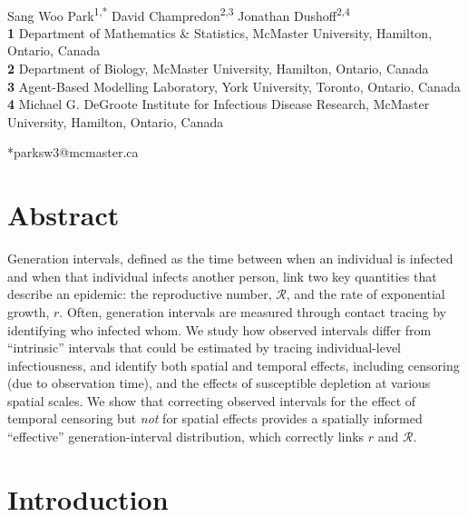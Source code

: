 \documentclass[12pt]{article}
\date{\today}
\newcommand{\RR}{\ensuremath{{\mathcal R}}}
\begin{document}
\begin{flushleft}{
	\Large
	\textbf{}
}
\newline
\\
Sang Woo Park\textsuperscript{1,*}
David Champredon\textsuperscript{2,3}
Jonathan Dushoff\textsuperscript{2,4}
\\

\bigskip
\textbf{1} Department of Mathematics \& Statistics, McMaster University, Hamilton, Ontario, Canada
\\
\textbf{2} Department of Biology, McMaster University, Hamilton, Ontario, Canada
\\
\textbf{3} Agent-Based Modelling Laboratory, York University, Toronto, Ontario, Canada
\\
\textbf{4} Michael G. DeGroote Institute for Infectious Disease Research, McMaster University, Hamilton, Ontario, Canada
\\
\bigskip

*parksw3@mcmaster.ca
\end{flushleft} 

\section*{Abstract}

Generation intervals, defined as the time between when an individual is infected and when that individual infects another person, link two key quantities that describe an epidemic: the reproductive number, $\RR$, and the rate of exponential growth, $r$.
Often, generation intervals are measured through contact tracing by identifying who infected whom.
We study how observed intervals differ from ``intrinsic'' intervals that could be estimated by tracing individual-level infectiousness, and identify both spatial and temporal effects, including censoring (due to observation time), and the effects of susceptible depletion at various spatial scales. 
We show that correcting observed intervals for the effect of temporal censoring but \emph{not} for spatial effects provides a spatially informed ``effective'' generation-interval distribution, which correctly links $r$ and $\RR$.

\section{Introduction}
\end{document}
